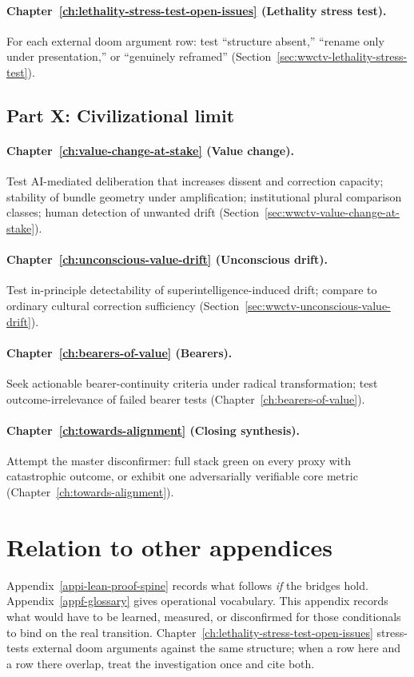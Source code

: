\paragraph{Chapter~\ref{ch:lethality-stress-test-open-issues} (Lethality stress test).}
For each external doom argument row: test ``structure absent,'' ``rename only under presentation,'' or ``genuinely reframed'' (Section~\ref{sec:wwctv-lethality-stress-test}).

\subsection{Part X: Civilizational limit}

\paragraph{Chapter~\ref{ch:value-change-at-stake} (Value change).}
Test AI-mediated deliberation that increases dissent and correction capacity; stability of bundle geometry under amplification; institutional plural comparison classes; human detection of unwanted drift (Section~\ref{sec:wwctv-value-change-at-stake}).

\paragraph{Chapter~\ref{ch:unconscious-value-drift} (Unconscious drift).}
Test in-principle detectability of superintelligence-induced drift; compare to ordinary cultural correction sufficiency (Section~\ref{sec:wwctv-unconscious-value-drift}).

\paragraph{Chapter~\ref{ch:bearers-of-value} (Bearers).}
Seek actionable bearer-continuity criteria under radical transformation; test outcome-irrelevance of failed bearer tests (Chapter~\ref{ch:bearers-of-value}).

\paragraph{Chapter~\ref{ch:towards-alignment} (Closing synthesis).}
Attempt the master disconfirmer: full stack green on every proxy with catastrophic outcome, or exhibit one adversarially verifiable core metric (Chapter~\ref{ch:towards-alignment}).

\section{Relation to other appendices}

Appendix~\ref{appi-lean-proof-spine} records what follows \emph{if} the bridges hold.
Appendix~\ref{appf-glossary} gives operational vocabulary.
This appendix records what would have to be learned, measured, or disconfirmed for those conditionals to bind on the real transition.
Chapter~\ref{ch:lethality-stress-test-open-issues} stress-tests external doom arguments against the same structure; when a row here and a row there overlap, treat the investigation once and cite both.
